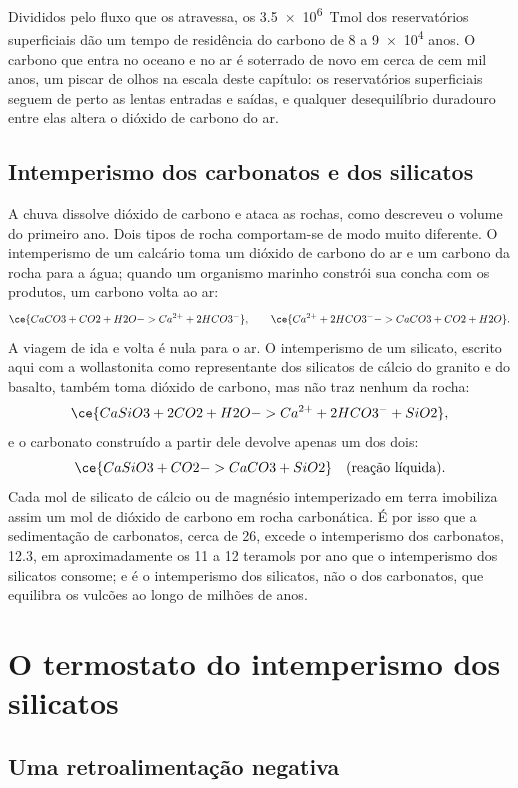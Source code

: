 Divididos pelo fluxo que os atravessa, os \qty{3.5e6}{Tmol} dos reservatórios superficiais dão um
tempo de residência do carbono de 8 a \num{9e4} anos. O carbono que entra no oceano e no ar é soterrado
de novo em cerca de cem mil anos, um piscar de olhos na escala deste capítulo: os reservatórios
superficiais seguem de perto as lentas entradas e saídas, e qualquer desequilíbrio duradouro entre elas
altera o dióxido de carbono do ar.

\subsection*{Intemperismo dos carbonatos e dos silicatos}

A chuva dissolve dióxido de carbono e ataca as rochas, como descreveu o volume do primeiro ano. Dois tipos de rocha
comportam-se de modo muito diferente. O intemperismo de um calcário toma um dióxido de carbono do ar e um
carbono da rocha para a água; quando um organismo marinho constrói sua concha com os produtos,
um carbono volta ao ar:
\[
  \ce{CaCO3 + CO2 + H2O -> Ca^{2+} + 2 HCO3^-} , \qquad
  \ce{Ca^{2+} + 2 HCO3^- -> CaCO3 + CO2 + H2O} .
\]
A viagem de ida e volta é nula para o ar. O intemperismo de um silicato, escrito aqui com a wollastonita como
representante dos silicatos de cálcio do granito e do basalto, também toma dióxido de carbono, mas não traz
nenhum da rocha:
\[
  \ce{CaSiO3 + 2 CO2 + H2O -> Ca^{2+} + 2 HCO3^- + SiO2} ,
\]
e o carbonato construído a partir dele devolve apenas um dos dois:
\[
  \ce{CaSiO3 + CO2 -> CaCO3 + SiO2} \quad\text{(reação líquida)} .
\]
Cada mol de silicato de cálcio ou de magnésio intemperizado em terra imobiliza assim um mol de dióxido de carbono
em rocha carbonática. É por isso que a sedimentação de carbonatos, cerca de 26, excede o intemperismo dos carbonatos,
12.3, em aproximadamente os 11 a 12 teramols por ano que o intemperismo dos silicatos consome; e é o
intemperismo dos silicatos, não o dos carbonatos, que equilibra os vulcões ao longo de milhões de anos.

\section{O termostato do intemperismo dos silicatos}\label{sec:b2:deep-time-climate:thermostat}

\subsection*{Uma retroalimentação negativa}

